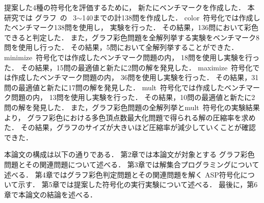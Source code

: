 提案した4種の符号化を評価するために，
新たにベンチマークを作成した．
本研究では
グラフ~\cite{Knuth:TAOCP:SAT}の
~3$\sim$140までの計138問を作成した．
\textsf{color}~符号化では作成したベンチマーク138問を使用し，
実験を行った．
その結果，136問において彩色できると判定した．
また，グラフ彩色問題を全解列挙する実験をベンチマーク8問を使用し行った．
その結果，5問において全解列挙することができた．
\textsf{minimize}~符号化では作成したベンチマーク問題の内，
18問を使用し実験を行った．
その結果，15問の最適値と新たに2問の解を発見した．
\textsf{maximize}~符号化では作成したベンチマーク問題の内，
36問を使用し実験を行った．
その結果，31問の最適値と新たに17問の解を発見した．
\textsf{mult}~符号化では作成したベンチマーク問題の内，
13問を使用し実験を行った．
その結果，10問の最適値と新たに2問の解を発見した．
また，グラフ彩色問題の全解列挙と\textsf{mult}~符号化の実験結果より，
グラフ彩色における多色頂点数最大化問題で得られる解の圧縮率を求めた．
その結果，グラフのサイズが大きいほど圧縮率が減少していくことが確認できた．


本論文の構成は以下の通りである．
第2章では本論文が対象とする
グラフ彩色問題とその関連問題について述べる．
第3章では解集合プログラミングについて述べる．
第4章ではグラフ彩色判定問題とその関連問題を解く
ASP符号化について示す．
第5章では提案した符号化の実行実験について述べる．
最後に，第6章で本論文の結論を述べる．


